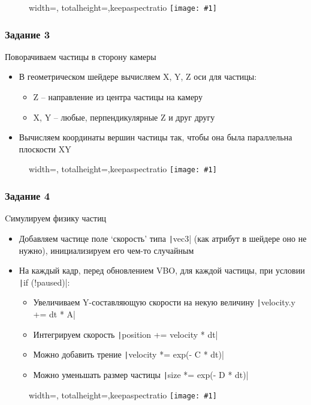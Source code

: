 \documentclass[10pt]{beamer}
\newcommand{\slideimage}[1]{
  \begin{figure}
    \begin{adjustbox}{width=\textwidth, totalheight=\textheight-2\baselineskip-2\baselineskip,keepaspectratio}
      \texttt{[image: \#1]}
    \end{adjustbox}
  \end{figure}
}
\begin{document}
\begin{frame}[fragile]
\slideimage{2.png}
\end{frame}

\begin{frame}[fragile]
\frametitle{Задание 3}
Поворачиваем частицы в сторону камеры
\begin{itemize}
\item В геометрическом шейдере вычисляем X, Y, Z оси для частицы:
\begin{itemize}
\item Z -- направление из центра частицы на камеру
\item X, Y -- любые, перпендикулярные Z и друг другу
\end{itemize}
\item Вычисляем координаты вершин частицы так, чтобы она была параллельна плоскости XY
\end{itemize}
\end{frame}

\begin{frame}[fragile]
\slideimage{3.png}
\end{frame}

\begin{frame}[fragile]
\frametitle{Задание 4}
Cимулируем физику частиц
\begin{itemize}
\item Добавляем частице поле `скорость' типа \texttt|vec3| (как атрибут в шейдере оно не нужно), инициализируем его чем-то случайным
\item На каждый кадр, перед обновлением VBO, для каждой частицы, при условии \texttt|if (!paused)|:
\begin{itemize}
\item Увеличиваем Y-составляющую скорости на некую величину \texttt|velocity.y += dt * A|
\item Интегрируем скорость \texttt|position += velocity * dt|
\item Можно добавить трение \texttt|velocity *= exp(- C * dt)|
\item Можно уменьшать размер частицы \texttt|size *= exp(- D * dt)|
\end{itemize}
\end{itemize}
\end{frame}

\begin{frame}[fragile]
\slideimage{4.png}
\end{frame}
\end{document}

